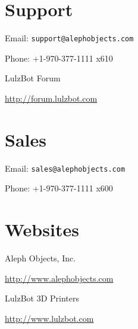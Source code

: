 %
%
%
%
%

\section{Support}
\setlength{\parindent}{0pt}
Email: \texttt{support@alephobjects.com}

Phone: +1-970-377-1111 x610

LulzBot Forum

\url{http://forum.lulzbot.com}

\section{Sales}

Email: \texttt{sales@alephobjects.com}

Phone: +1-970-377-1111 x600

\section{Websites}

Aleph Objects, Inc.

\url{http://www.alephobjects.com}

LulzBot 3D Printers

\url{http://www.lulzbot.com}

